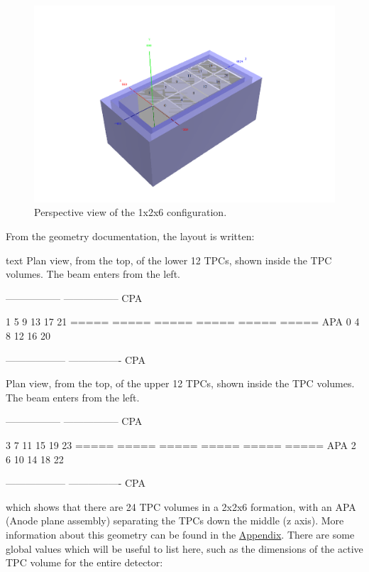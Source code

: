 \documentclass[8pt]{refart}
\begin{document}
\begin{figure}[H]
    \centering
    \includegraphics[width=\linewidth]{graphics/duneworkspace126_lowerhalf_numbered.png}
    \caption{Perspective view of the 1x2x6 configuration.}
    \label{fig:my_label}
\end{figure}
From the geometry documentation, the layout is written:
\begin{code}{text}
Plan view, from the top, of the lower 12 TPCs, 
shown inside the TPC volumes.  
The beam enters from the left.

   ----------------- -----------------  CPA

     1     5     9    13    17    21
   ===== ===== ===== ===== ===== =====  APA
     0     4     8    12    16    20

   ------------------ ----------------  CPA

Plan view, from the top, of the upper 12 TPCs, 
shown inside the TPC volumes.  
The beam enters from the left.

   ----------------- -----------------  CPA

     3     7    11    15    19    23
   ===== ===== ===== ===== ===== =====  APA
     2     6    10    14    18    22

   ------------------ ----------------  CPA
\end{code}
which shows that there are 24 TPC volumes in a 2x2x6 formation, with an APA (Anode plane assembly) separating the TPCs down the middle (z axis).  More information about this geometry can be found in the \hyperref[1x2x6appendix]{Appendix}.  There are some global values which will be useful to list here, such as the dimensions of the active TPC volume for the entire detector:
\end{document}
